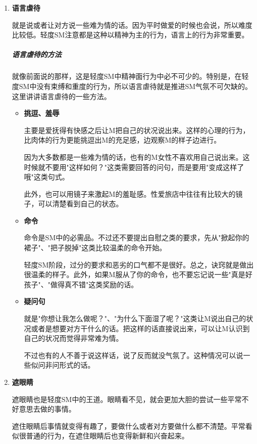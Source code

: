 \documentclass[12pt,UTF8]{ctexbook}
\begin{document}
\begin{enumerate}
	\item \textbf{语言虐待}

	就是说或者让对方说一些难为情的话。因为平时做爱的时候也会说，所以难度比较低。轻度SM注意都是这种以精神为主的行为，语言上的行为非常重要。

	\subparagraph{语言虐待的方法}

	就像前面说的那样，这是轻度SM中精神面行为中必不可少的。特别是，在轻度SM中没有束缚和重度的行为，所以语言虐待就是推进SM气氛不可欠缺的。这里讲讲语言虐待的一些方法。

	\begin{itemize}
		\item \textbf{挑逗、羞辱}

		主要是爱抚得有快感之后让M把自己的状况说出来。这样的心理的行为，比肉体的行为更能挑逗出M的充足感，边观察M的样子边进行。

		因为大多数都是一些难为情的话，也有的M女性不喜欢用自己说出来。这时候就不要用"这样如何？"这类需要回答的问句，而是要用"变成这样了哦"这类句式。

		此外，也可以用镜子来激起M的羞耻感。性爱旅店中往往有比较大的镜子，可以清楚看到自己的状态。

		\item \textbf{命令}

		命令是SM中的必需品。不过还不要提出自慰之类的要求，先从"掀起你的裙子"、"把子脱掉"这类比较温柔的命令开始。

		轻度SM阶段，过分的要求和恶劣的口气都不是很好。总之，诀窍就是做出很温柔的样子。此外，如果M服从了你的命令，也不要忘记说一些"真是好孩子"、"做得真不错"这类奖励的话。

		\item \textbf{疑问句}

		就是"你想让我怎么做呢？"、"为什么下面湿了呢？"这类让M说出自己的状况或者是想要对方干什么的话。把这样的话直接说出来，可以让M认识到自己的状况而觉得非常难为情。

		不过也有的人不善于说这样话，说了反而就没气氛了。这种情况可以说一些似问非问形式的话。
	\end{itemize}

	\item \textbf{遮眼睛}

遮眼睛也是轻度SM中的王道。眼睛看不见，就会更加大胆的尝试一些平常不好意思去做的事情。

遮住眼睛后事情就变得有趣了，要做什么或者对方要做什么都不清楚。平常看似很普通的行为，在遮住眼睛后也变得新鲜和兴奋起来。


\end{enumerate}
\end{document}
